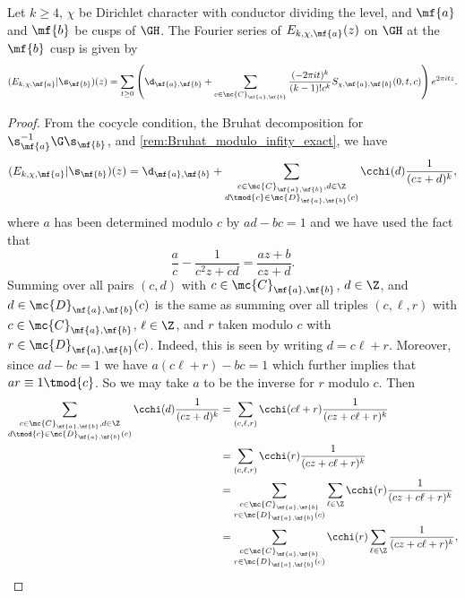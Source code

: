     \begin{proposition}\label{prop:Fourier_series_Eisenstein_holomorphic}
      Let $k \ge 4$, $\chi$ be Dirichlet character with conductor dividing the level, and $\mf{a}$ and $\mf{b}$ be cusps of $\GH$. The Fourier series of $E_{k,\chi,\mf{a}}(z)$ on $\GH$ at the $\mf{b}$ cusp is given by
      \[
        (E_{k,\chi,\mf{a}}|\s_{\mf{b}})(z) = \sum_{t \ge 0}\left(\d_{\mf{a},\mf{b}}+\sum_{\substack{c \in \mc{C}_{\mf{a},\mf{b}}}}\frac{(-2\pi it)^{k}}{(k-1)!c^{k}}S_{\chi,\mf{a},\mf{b}}(0,t,c)\right)e^{2\pi itz}.
      \]
    \end{proposition}
    \begin{proof}
      From the cocycle condition, the Bruhat decomposition for $\s_{\mf{a}}^{-1}\G\s_{\mf{b}}$, and \cref{rem:Bruhat_modulo_infity_exact}, we have
      \[
        (E_{k,\chi,\mf{a}}|\s_{\mf{b}})(z) = \d_{\mf{a},\mf{b}}+\sum_{\substack{c \in \mc{C}_{\mf{a},\mf{b}}, d \in \Z \\ d \tmod{c} \in \mc{D}_{\mf{a},\mf{b}}(c)}}\cchi(d)\frac{1}{(cz+d)^{k}},
      \]
      where $a$ has been determined modulo $c$ by $ad-bc = 1$ and we have used the fact that
      \[
        \frac{a}{c}-\frac{1}{c^{2}z+cd} = \frac{az+b}{cz+d}.
      \]
      Summing over all pairs $(c,d)$ with $c \in \mc{C}_{\mf{a},\mf{b}}$, $d \in \Z$, and $d \in \mc{D}_{\mf{a},\mf{b}}(c)$ is the same as summing over all triples $(c,\ell,r)$ with $c \in \mc{C}_{\mf{a},\mf{b}}$, $\ell \in \Z$, and $r$ taken modulo $c$ with $r \in \mc{D}_{\mf{a},\mf{b}}(c)$. Indeed, this is seen by writing $d = c\ell+r$. Moreover, since $ad-bc = 1$ we have $a(c\ell+r)-bc = 1$ which further implies that $ar \equiv 1 \tmod{c}$. So we may take $a$ to be the inverse for $r$ modulo $c$. Then
      \begin{align*}
        \sum_{\substack{c \in \mc{C}_{\mf{a},\mf{b}}, d \in \Z \\ d \tmod{c} \in \mc{D}_{\mf{a},\mf{b}}(c)}}\cchi(d)\frac{1}{(cz+d)^{k}} &= \sum_{(c,\ell,r)}\cchi(c\ell+r)\frac{1}{(cz+c\ell+r)^{k}} \\
        &= \sum_{(c,\ell,r)}\cchi(r)\frac{1}{(cz+c\ell+r)^{k}} \\
        &= \sum_{\substack{c \in \mc{C}_{\mf{a},\mf{b}} \\ r \in \mc{D}_{\mf{a},\mf{b}}(c)}}\sum_{\ell \in \Z}\cchi(r)\frac{1}{(cz+c\ell+r)^{k}} \\
        &= \sum_{\substack{c \in \mc{C}_{\mf{a},\mf{b}} \\ r \in \mc{D}_{\mf{a},\mf{b}}(c)}}\cchi(r)\sum_{\ell \in \Z}\frac{1}{(cz+c\ell+r)^{k}},

\end{align*}
\end{proof}
